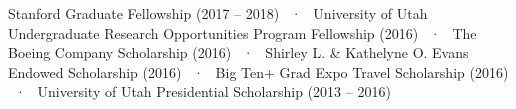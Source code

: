 

\begin{cvparagraph}

Stanford Graduate Fellowship (2017 – 2018) ~·~ University of Utah Undergraduate Research Opportunities Program Fellowship (2016) ~·~ The Boeing Company Scholarship (2016) ~·~ Shirley L. \& Kathelyne O. Evans Endowed Scholarship (2016) ~·~ Big Ten+ Grad Expo Travel Scholarship (2016) ~·~ University of Utah Presidential Scholarship (2013 – 2016)
\end{cvparagraph}
